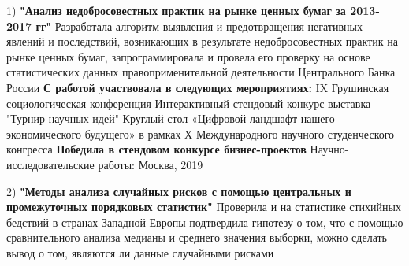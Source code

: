 \documentclass[]{awesome-cv}
\begin{document}
\vspace{-9mm}
\begin{cventries}
	\cventry
	{1) \textbf{"Анализ  недобросовестных практик на рынке ценных бумаг за 2013-2017 гг"}
	\newline \qquad \bullet  Разработала алгоритм выявления и предотвращения негативных явлений и последствий, возникающих в результате недобросовестных практик на рынке ценных бумаг, запрограммировала и провела его проверку на основе статистических данных правоприменительной деятельности Центрального Банка России
	\newline 
	\textbf{С работой участвовала в следующих мероприятиях:}
	\newline \quad IX Грушинская социологическая конференция  
	\newline \quad Интерактивный стендовый конкурс-выставка "Турнир научных идей"  
	\newline \quad Круглый стол «Цифровой ландшафт нашего экономического будущего» в рамках Х 
	\newline \quad Международного научного студенческого конгресса
	\newline \textbf{Победила в стендовом конкурсе бизнес-проектов} } 
	{Научно-исследовательские работы:}
	{Москва, 2019}
	{}
	{}
		\end{cventries}  \vspace{-6mm} \begin{cventries}
	\cventry
	{2) \textbf{"Методы анализа случайных рисков с помощью центральных и 
промежуточных порядковых статистик"}
	\newline \qquad \bullet Проверила и на статистике стихийных бедствий в странах Западной Европы подтвердила гипотезу о том, что с помощью сравнительного анализа медианы и среднего значения выборки, можно сделать вывод о том, являются ли данные случайными рисками
	}
	{}%
	{}
	{}
	{}
	\vspace{-5mm}
\end{cventries}
\end{document}
